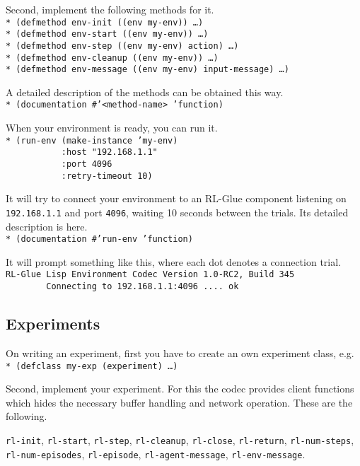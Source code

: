 \documentclass[11pt,a4paper,dvipdfm]{article}
\newcommand{\prompttext}[1]{\texttt{#1}}
\newcommand{\lispprompt}[1]{\prompttext{* #1}}
\begin{document}
Second, implement the following methods for it. \\
\lispprompt{(defmethod env-init ((env my-env)) \ldots)} \\
\lispprompt{(defmethod env-start ((env my-env)) \ldots)} \\
\lispprompt{(defmethod env-step ((env my-env) action) \ldots)} \\
\lispprompt{(defmethod env-cleanup ((env my-env)) \ldots)} \\
\lispprompt{(defmethod env-message ((env my-env) input-message) \ldots)}

A detailed description of the methods can be obtained this way. \\
\lispprompt{(documentation \#'<method-name> 'function)}

When your environment is ready, you can run it. \\
\lispprompt{(run-env (make-instance 'my-env) \\
\mbox{~~~~~~~~~~~}:host "192.168.1.1" \\
\mbox{~~~~~~~~~~~}:port 4096 \\
\mbox{~~~~~~~~~~~}:retry-timeout 10)}

It will try to connect your environment to an RL-Glue component listening on
\prompttext{192.168.1.1} and port \prompttext{4096}, waiting 10 seconds
between the trials. Its detailed description is here. \\
\lispprompt{(documentation \#'run-env 'function)}

It will prompt something like this, where each dot denotes a connection
trial. \\
\prompttext{RL-Glue Lisp Environment Codec Version 1.0-RC2, Build 345} \\
\prompttext{\mbox{~~~~~~~~}Connecting to 192.168.1.1:4096 ....~ok}

\subsection{Experiments}

On writing an experiment, first you have to create an own experiment class,
e.g. \\
\lispprompt{(defclass my-exp (experiment) \ldots)}

Second, implement your experiment. For this the codec provides client
functions which hides the necessary buffer handling and network operation.
These are the following.

\prompttext{rl-init},
\prompttext{rl-start},
\prompttext{rl-step},
\prompttext{rl-cleanup},
\prompttext{rl-close},
\prompttext{rl-return},
\prompttext{rl-num-steps}, \\
\prompttext{rl-num-episodes},
\prompttext{rl-episode},
\prompttext{rl-agent-message},
\prompttext{rl-env-message}.
\end{document}
